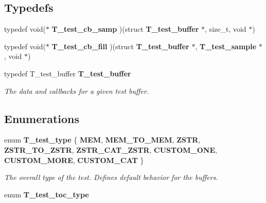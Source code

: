 \subsection*{Typedefs}
\begin{CompactItemize}
\item 
typedef void($\ast$ {\bf T\_\-test\_\-cb\_\-samp} )(struct {\bf T\_\-test\_\-buffer} $\ast$, size\_\-t, void $\ast$)
\item 
typedef void($\ast$ {\bf T\_\-test\_\-cb\_\-fill} )(struct {\bf T\_\-test\_\-buffer} $\ast$, {\bf T\_\-test\_\-sample} $\ast$, void $\ast$)
\item 
{}
typedef T\_\-test\_\-buffer {\bf T\_\-test\_\-buffer}\label{test__utils_8h_a21}

\begin{CompactList}\small\item\em The data and callbacks for a given test buffer.\item\end{CompactList}\end{CompactItemize}
\subsection*{Enumerations}
\begin{CompactItemize}
\item 
enum {\bf T\_\-test\_\-type} \{ {\bf MEM}, 
{\bf MEM\_\-TO\_\-MEM}, 
{\bf ZSTR}, 
{\bf ZSTR\_\-TO\_\-ZSTR}, 
{\bf ZSTR\_\-CAT\_\-ZSTR}, 
{\bf CUSTOM\_\-ONE}, 
{\bf CUSTOM\_\-MORE}, 
{\bf CUSTOM\_\-CAT}
 \}
\begin{CompactList}\small\item\em The overall type of the test. Defines default behavior for the buffers.\item\end{CompactList}\item 
enum {\bf T\_\-test\_\-toc\_\-type} 
\end{CompactItemize}
